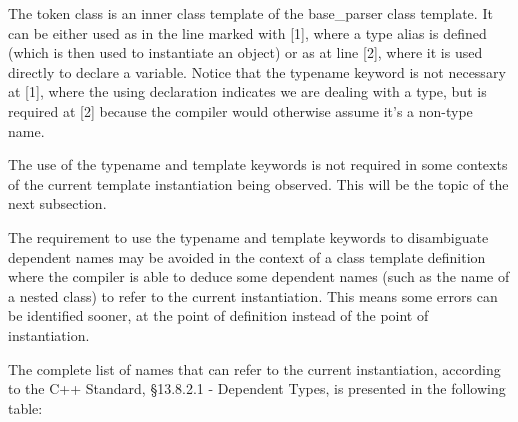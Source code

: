 The token class is an inner class template of the base\_parser class template. It can be either used as in the line marked with [1], where a type alias is defined (which is then used to instantiate an object) or as at line [2], where it is used directly to declare a variable. Notice that the typename keyword is not necessary at [1], where the using declaration indicates we are dealing with a type, but is required at [2] because the compiler would otherwise assume it’s a non-type name.

The use of the typename and template keywords is not required in some contexts of the current template instantiation being observed. This will be the topic of the next subsection.


The requirement to use the typename and template keywords to disambiguate dependent names may be avoided in the context of a class template definition where the compiler is able to deduce some dependent names (such as the name of a nested class) to refer to the current instantiation. This means some errors can be identified sooner, at the point of definition instead of the point of instantiation.

The complete list of names that can refer to the current instantiation, according to the C++ Standard, §13.8.2.1 - Dependent Types, is presented in the following table:

